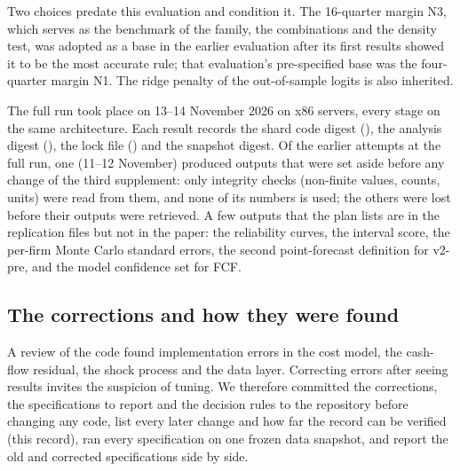 Two choices predate this evaluation and condition it. The 16-quarter margin N3, which serves as the benchmark of the family, the combinations and the density test, was adopted as a base in the earlier evaluation after its first results showed it to be the most accurate rule; that evaluation's pre-specified base was the four-quarter margin N1. The ridge penalty of the out-of-sample logits is also inherited.

The full run took place on 13--14 November 2026 on x86 servers, every stage on the same architecture. Each result records the shard code digest (\repoid{\ShardDigest}), the analysis digest (\repoid{\AnalysisDigest}), the lock file (\repoid{\LockDigest}) and the snapshot digest. Of the earlier attempts at the full run, one (11--12 November) produced outputs that were set aside before any change of the third supplement: only integrity checks (non-finite values, counts, units) were read from them, and none of its numbers is used; the others were lost before their outputs were retrieved. A few outputs that the plan lists are in the replication files but not in the paper: the reliability curves, the interval score, the per-firm Monte Carlo standard errors, the second point-forecast definition for v2-pre, and the model confidence set for FCF.

\subsection{The corrections and how they were found}
A review of the code found implementation errors in the cost model, the cash-flow residual, the shock process and the data layer. Correcting errors after seeing results invites the suspicion of tuning. We therefore committed the corrections, the specifications to report and the decision rules to the repository before changing any code, list every later change and how far the record can be verified (this record), ran every specification on one frozen data snapshot, and report the old and corrected specifications side by side.


